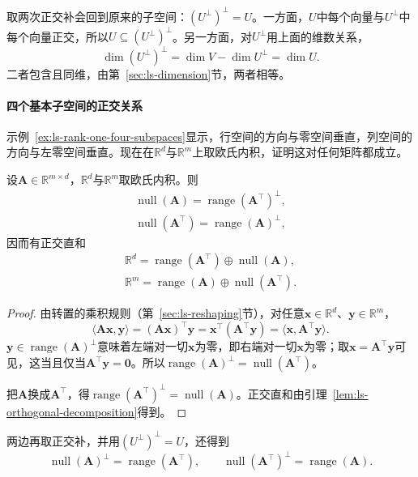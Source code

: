 取两次正交补会回到原来的子空间：$(U^\perp)^\perp=U$。一方面，$U$中每个向量与$U^\perp$中每个向量正交，所以$U\subseteq(U^\perp)^\perp$。另一方面，对$U^\perp$用上面的维数关系，
\[
 \dim(U^\perp)^\perp=\dim V-\dim U^\perp=\dim U .
\]
二者包含且同维，由第~\ref{sec:ls-dimension}节，两者相等。

\paragraph{四个基本子空间的正交关系}
示例~\ref{ex:ls-rank-one-four-subspaces}显示，行空间的方向与零空间垂直，列空间的方向与左零空间垂直。现在在$\mathbb R^d$与$\mathbb R^m$上取欧氏内积，证明这对任何矩阵都成立。
\begin{theorem}[四个基本子空间的正交关系]
\label{thm:ls-four-subspaces-orthogonality}
设$\bm A\in\mathbb R^{m\times d}$，$\mathbb R^d$与$\mathbb R^m$取欧氏内积。则
\begin{equation}
\begin{gathered}
\operatorname{null}(\bm A)=\operatorname{range}(\bm A^\top)^\perp,\\
\operatorname{null}(\bm A^\top)=\operatorname{range}(\bm A)^\perp,
\end{gathered}
\label{eq:ls-four-subspaces-orthogonality}
\end{equation}
因而有正交直和
\begin{equation}
\begin{gathered}
\mathbb R^d=\operatorname{range}(\bm A^\top)\oplus\operatorname{null}(\bm A),\\
\mathbb R^m=\operatorname{range}(\bm A)\oplus\operatorname{null}(\bm A^\top).
\end{gathered}
\label{eq:ls-four-subspaces-decomposition}
\end{equation}
\end{theorem}
\begin{proof}
由转置的乘积规则（第~\ref{sec:ls-reshaping}节），对任意$\bm x\in\mathbb R^d$、$\bm y\in\mathbb R^m$，
\[
 \langle\bm A\bm x,\bm y\rangle=(\bm A\bm x)^\top\bm y=\bm x^\top(\bm A^\top\bm y)=\langle\bm x,\bm A^\top\bm y\rangle.
\]
$\bm y\in\operatorname{range}(\bm A)^\perp$意味着左端对一切$\bm x$为零，即右端对一切$\bm x$为零；取$\bm x=\bm A^\top\bm y$可见，这当且仅当$\bm A^\top\bm y=\bm0$。所以$\operatorname{range}(\bm A)^\perp=\operatorname{null}(\bm A^\top)$。

把$\bm A$换成$\bm A^\top$，得$\operatorname{range}(\bm A^\top)^\perp=\operatorname{null}(\bm A)$。正交直和由引理~\ref{lem:ls-orthogonal-decomposition}得到。
\end{proof}
两边再取正交补，并用$(U^\perp)^\perp=U$，还得到
\[
 \operatorname{null}(\bm A)^\perp=\operatorname{range}(\bm A^\top),\qquad
 \operatorname{null}(\bm A^\top)^\perp=\operatorname{range}(\bm A).
\]


